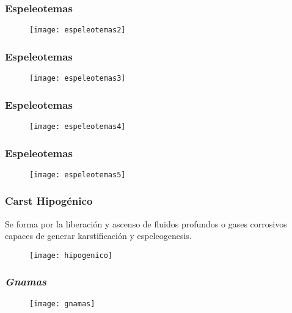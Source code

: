 \documentclass{beamer}
\begin{document}
\begin{frame}
\frametitle{Espeleotemas}
\begin{figure}
\begin{center}
   	\texttt{[image: espeleotemas2]}
\end{center}
\end{figure}
\end{frame}
\begin{frame}
\frametitle{Espeleotemas}
\begin{figure}
\begin{center}
   	\texttt{[image: espeleotemas3]}
\end{center}
\end{figure}
\end{frame}
\begin{frame}
\frametitle{Espeleotemas}
\begin{figure}
\begin{center}
   	\texttt{[image: espeleotemas4]}
\end{center}
\end{figure}
\end{frame}
\begin{frame}
\frametitle{Espeleotemas}
\begin{figure}
\begin{center}
   	\texttt{[image: espeleotemas5]}
\end{center}
\end{figure}
\end{frame}
\begin{frame}
\frametitle{Carst Hipogénico}
\small{Se forma por la liberación y ascenso de fluidos profundos o gases corrosivos capaces de generar karstificación y espeleogenesis.}
\begin{figure}
\begin{center}
   	\texttt{[image: hipogenico]}
\end{center}
\end{figure}
\end{frame}
\begin{frame}
\frametitle{\emph{Gnamas}}
\begin{figure}
\begin{center}
   	\texttt{[image: gnamas]}
\end{center}
\end{figure}
\end{frame}
\end{document}
